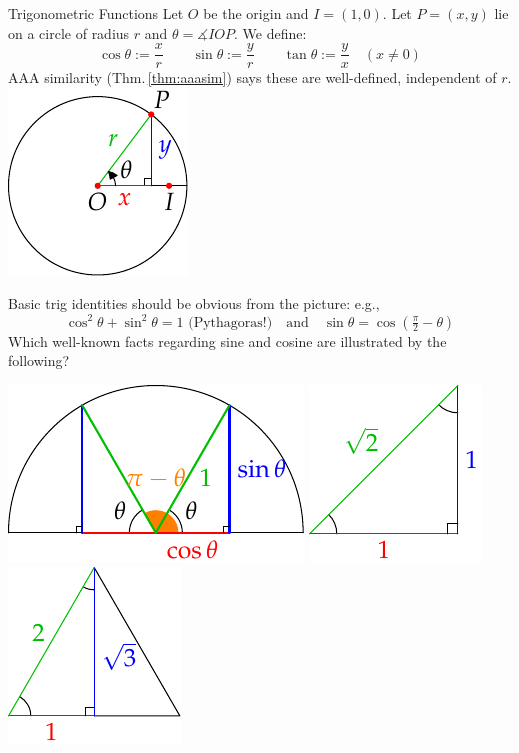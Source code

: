 \begin{defn}[lower separated=false, sidebyside, sidebyside align=top seam, sidebyside gap=0pt, righthand width=0.23\linewidth]{Trigonometric Functions}{}
	Let $O$ be the origin and $I=(1,0)$. Let $P=(x,y)$ lie on a circle of radius $r$ and $\theta=\measuredangle IOP$. We define:
	\[
		\cos\theta :=\frac xr\qquad \sin\theta:=\frac yr\qquad \tan\theta:=\frac yx\quad (x\neq 0)
	\]
	AAA similarity (Thm.\,\ref{thm:aaasim}) says these are well-defined, independent of $r$.
	\tcblower
	\flushright
	\includegraphics[scale=0.95]{angles-sine}
\end{defn}

\begin{example}{}{}
	Basic trig identities should be obvious from the picture: e.g.,
	\[
		\cos^2\theta+\sin^2\theta=1 \text{ (Pythagoras!)}
		\quad\text{and}\quad
		\sin\theta=\cos(\tfrac\pi 2-\theta)
	\]
	Which well-known facts regarding sine and cosine are illustrated by the following?
	\begin{center}
		\includegraphics[scale=0.95]{angles-trigbasic1}
		\qquad
		\includegraphics[scale=0.95]{angles-trigbasic2}
		\qquad
		\includegraphics[scale=0.95]{angles-trigbasic3}
	\end{center}
\end{example}



